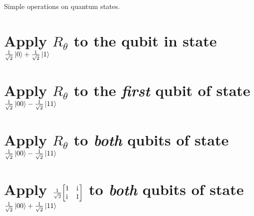 \documentclass[boxes]{homework}
\newcommand{\iu}{\mathrm{i}\mkern1mu}
\begin{document}
\begin{problem}
Simple operations on quantum states.
\begin{parts}
	\part{Apply $R_\theta$ to the qubit in state $\frac{1}{\sqrt{2}}\ket{0} + \frac{1}{\sqrt{2}}\ket{1}$}\label{part:1a}
	\part{Apply $R_\theta$ to the \emph{first} qubit of state $\frac{1}{\sqrt{2}}\ket{00} - \frac{1}{\sqrt{2}}\ket{11}$}\label{part:1b}
	\part{Apply $R_\theta$ to \emph{both} qubits of state $\frac{1}{\sqrt{2}}\ket{00} - \frac{1}{\sqrt{2}}\ket{11}$}\label{part:1c}
	\part{Apply $\frac{1}{\sqrt{2}}\mqty[1 & \iu \\ \iu & 1]$ to \emph{both} qubits of state $\frac{1}{\sqrt{2}}\ket{00} + \frac{1}{\sqrt{2}}\ket{11}$}\label{part:1d}
\end{parts}
\end{problem}
\end{document}
